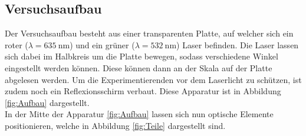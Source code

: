 \subsection{Versuchsaufbau}
\label{sec:aufbau}
Der Versuchsaufbau besteht aus einer transparenten Platte, auf welcher sich ein roter
($\lambda=\SI{635}{\nano\metre}$) und ein grüner ($\lambda=\SI{532}{\nano\metre}$) Laser
befinden. Die Laser lassen sich dabei im Halbkreis um die Platte bewegen, sodass verschiedene
Winkel eingestellt werden können. Diese können dann an der Skala auf der Platte abgelesen werden.
Um die Experimentierenden vor dem Laserlicht zu schützen, ist zudem noch ein Reflexionsschirm
verbaut. Diese Apparatur ist in Abbildung \ref{fig:Aufbau} dargestellt.
\\\noindent
In der Mitte der Apparatur \ref{fig:Aufbau} lassen sich nun optische Elemente positionieren, welche
in Abbildung \ref{fig:Teile} dargestellt sind.
%
%
